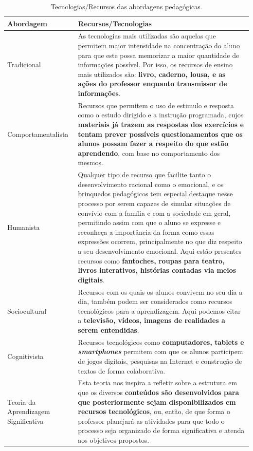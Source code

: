 \begin{table}[htbp]
\caption{Tecnologias/Recursos das abordagens pedagógicas.}
\label{tab:abordagens-pedagogicas:tecnologia}
\begin{tabularx}{\textwidth}{p{3.5cm}|X} \hline
\textbf{Abordagem} & \textbf{Recursos/Tecnologias} \\ \hline
Tradicional & As tecnologias mais utilizadas são aquelas que permitem maior intensidade na concentração do aluno para que este possa memorizar a maior quantidade de informações possível. Por isso, os recursos de ensino mais utilizados são: \textbf{livro, caderno, lousa, e as ações do professor enquanto transmissor de informações}. \\ \hline
Comportamentalista & Recursos que permitem o uso de estimulo e resposta como o estudo dirigido e a instrução programada, cujos \textbf{materiais já trazem as respostas dos exercícios e tentam prever possíveis questionamentos que os alunos possam fazer a respeito do que estão aprendendo}, com base no comportamento dos mesmos. \\ \hline
Humanista & Qualquer tipo de recurso que facilite tanto o desenvolvimento racional como o emocional, e os brinquedos pedagógicos tem especial destaque nesse processo por serem capazes de simular situações de convívio com a família e com a sociedade em geral, permitindo assim com que o aluno se expresse e reconheça a importância da forma como essas expressões ocorrem, principalmente no que diz respeito a seu desenvolvimento emocional. Aqui estão presentes recursos como \textbf{fantoches, roupas para teatro, livros interativos, histórias contadas via meios digitais}. \\ \hline
Sociocultural & Recursos com os quais os alunos convivem no seu dia a dia, também podem ser considerados como recursos tecnológicos para a aprendizagem. Aqui podemos citar a \textbf{televisão, vídeos, imagens de realidades a serem entendidas}. \\ \hline
Cognitivista & Recursos tecnológicos como \textbf{computadores, tablets e \textit{smartphones}} permitem com que os alunos participem de jogos digitais, pesquisas na Internet e construção de textos de forma colaborativa. \\ \hline
Teoria da Aprendizagem Significativa & Esta teoria nos inspira a refletir sobre a estrutura em que os diversos \textbf{conteúdos são desenvolvidos para que posteriormente sejam disponibilizados em recursos tecnológicos}, ou, então, de que forma o professor planejará as atividades para que todo o processo seja organizado de forma significativa e atenda aos objetivos propostos. \\ \hline

\end{tabularx}
\end{table}
